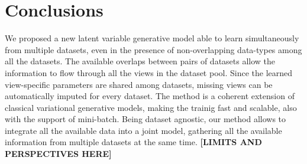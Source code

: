 \section{Conclusions}
We proposed a new latent variable generative model able to learn simultaneously from multiple datasets, even in the presence of non-overlapping data-types among all the datasets.
The available overlaps between pairs of datasets allow the information to flow through all the views in the dataset pool.
Since the learned view-specific parameters are shared among datasets, missing views can be automatically imputed for every dataset.
The method is a coherent extension of classical variational generative models, making the trainig fast and scalable, also with the support of mini-batch.
Being dataset agnostic, our method allows to integrate all the available data into a joint model, gathering  all the available information from multiple datasets at the same time.
\textbf{[LIMITS AND PERSPECTIVES HERE]}
